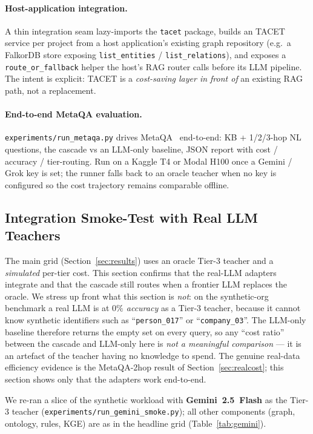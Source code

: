 \documentclass[11pt]{article}
\theoremstyle{plain}
\begin{document}
\paragraph{Host-application integration.}
A thin integration seam lazy-imports the \texttt{tacet} package, builds an
TACET service per project from a host application's existing graph
repository (e.g.\ a FalkorDB store exposing \texttt{list\_entities} /
\texttt{list\_relations}), and exposes a \texttt{route\_or\_fallback} helper
the host's RAG router calls before its LLM pipeline. The intent is explicit:
TACET is a \emph{cost-saving layer in front of} an existing RAG path,
not a replacement.

\paragraph{End-to-end MetaQA evaluation.}
\texttt{experiments/run\_metaqa.py} drives MetaQA~\citep{zhang2018metaqa}
end-to-end: KB + 1/2/3-hop NL questions, the cascade vs an LLM-only
baseline, JSON report with cost / accuracy / tier-routing. Run on a
Kaggle T4 or Modal H100 once a Gemini / Grok key is set; the runner
falls back to an oracle teacher when no key is configured so the cost
trajectory remains comparable offline.

\subsection{Integration Smoke-Test with Real LLM Teachers}
\label{sec:smoketest}

The main grid (Section~\ref{sec:results}) uses an oracle Tier-3 teacher and a
\emph{simulated} per-tier cost. This section confirms that the real-LLM
adapters integrate and that the cascade still routes when a frontier LLM
replaces the oracle. We stress up front what this section is \emph{not}: on the
synthetic-org benchmark a real LLM is at \emph{$0\%$ accuracy} as a Tier-3
teacher, because it cannot know synthetic identifiers such as
``\texttt{person\_017}'' or ``\texttt{company\_03}''. The LLM-only baseline
therefore returns the empty set on every query, so any ``cost ratio'' between
the cascade and LLM-only here is \emph{not a meaningful comparison} --- it is an
artefact of the teacher having no knowledge to spend. The genuine real-data
efficiency evidence is the MetaQA-2hop result of Section~\ref{sec:realcost};
this section shows only that the adapters work end-to-end.

We re-ran a slice of the synthetic workload with \textbf{Gemini~2.5~Flash} as
the Tier-3 teacher (\texttt{experiments/run\_gemini\_smoke.py}); all other
components (graph, ontology, rules, KGE) are as in the headline grid
(Table~\ref{tab:gemini}).
\end{document}
